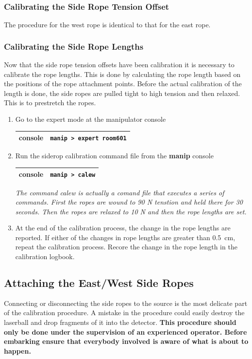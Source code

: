 \documentclass[11pt]{article}
\begin{document}
\subsubsection{Calibrating the Side Rope Tension Offset}
The procedure for the west rope is identical to that for the east rope.

\subsubsection{Calibrating the Side Rope Lengths}
Now that the side rope tension offsets have been calibration it is necessary to calibrate the rope lengths. This is done by calculating the rope length based on the positions of the rope attachment points. Before the actual calibration of the length is done, the side ropes are pulled tight to high tension and then relaxed. This is to prestretch the ropes.
\begin{enumerate}
\item \CheckBox[name=csrl1]{} Go to the expert mode at the manipulator console
\begin{tabular}{|c|c|}
\hline
console & \verb+manip > expert room601+\\
\hline
\end{tabular}
\item \CheckBox[name=csrl2]{} Run the siderop calibration command file from the {\bf manip} console
\begin{tabular}{|c|c|}
\hline
console & \verb+manip > calew+\\
\hline
\end{tabular}
{\it The command calew is actually a comand file that executes a series of commands. First the ropes are wound to 90 N tenstion and held there for 30 seconds. Then the ropes are relaxed to 10 N and then the rope lengths are set.}
\item \CheckBox[name=csrl3] At the end of the calibration process, the change in the rope lengths are reported. If either of the changes in rope lengths are greater than 0.5~cm, repeat the calibration process. Recore the change in the rope length in the calibration logbook.
\end{enumerate}

\subsection{Attaching the East/West Side Ropes}

Connecting or disconnecting the side ropes to the source is the most delicate part of the calibration procedure. A mistake in the procedure could easily destroy the laserball and drop fragments of it into the detector. {\bf This procedure should only be done under the supervision of an experienced operator. Before embarking ensure that everybody involved is aware of what is about to happen.}
\end{document}
